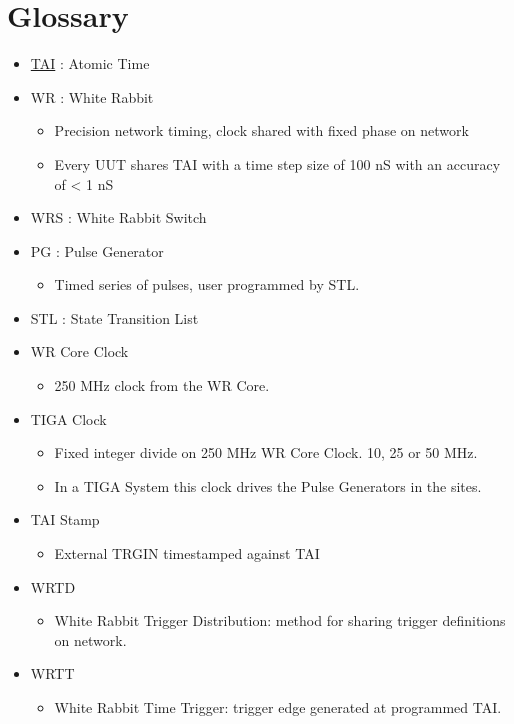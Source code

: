 \documentclass[]{article}
\begin{document}
\section{Glossary}
\begin{itemize}
	\setlength\itemsep{0pt}
	\item \href{https://www.timeanddate.com/time/international-atomic-time.html}{TAI} : Atomic Time
	\item WR : White Rabbit
	\begin{itemize}
		\item Precision network timing, clock shared with fixed phase on network
		\item Every UUT shares TAI with a time step size of 100 nS with an accuracy of < 1 nS
	\end{itemize}
	\item WRS : White Rabbit Switch
	\item PG : Pulse Generator
	\begin{itemize}
		\item Timed series of pulses, user programmed by STL.
	\end{itemize}
	\item STL : State Transition List
	\item WR Core Clock
	\begin{itemize}
		\item 250 MHz clock from the WR Core.
	\end{itemize}
	\item TIGA Clock
	\begin{itemize}
		\item Fixed integer divide on 250 MHz WR Core Clock. 10, 25 or 50 MHz.
		\item In a TIGA System this clock drives the Pulse Generators in the sites.
	\end{itemize}
	\item TAI Stamp
	\begin{itemize}
		\item External TRGIN timestamped against TAI 
	\end{itemize}
	\item WRTD
	\begin{itemize}
		\item White Rabbit Trigger Distribution: method for sharing trigger definitions on network.
	\end{itemize}
	\item WRTT
	\begin{itemize}
		\item White Rabbit Time Trigger: trigger edge generated at programmed TAI.

\end{itemize}
\end{itemize}
\end{document}
